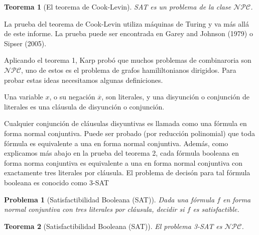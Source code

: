 \documentclass{article}
\newtheorem{theorem}{Teorema}
\newtheorem{problem}{Problema}
\begin{document}
\begin{theorem}[El teorema de Cook-Levin]
SAT es un problema de la clase $\mathcal{NPC}$.
\end{theorem}
La prueba del teorema de Cook-Levin utiliza máquinas de Turing
y va más allá de este informe. La prueba puede ser encontrada
en Garey and Johnson (1979) o Sipser (2005).

Aplicando el teorema 1, Karp probó que muchos problemas de
combinaroria son $\mathcal{NPC}$, uno de estos es el problema
de grafos hamililtonianos dirigidos. Para probar estas ideas
necesitamos algunas definiciones.

Una variable $x$, o su negación $\overline{x}$, son literales,
y una disyunción o conjunción de literales es una cláusula
de disyunción o conjunción.

Cualquier conjunción de cláusulas disyuntivas es llamada como
una fórmula en forma normal conjuntiva. Puede ser probado 
(por reducción polinomial) que toda fórmula es equivalente
a una en forma normal conjuntiva. Además, como explicamos más
abajo en la prueba del teorema 2, cada fórmula booleana en 
forma norma conjuntiva es equivalente a una en forma normal
conjuntiva con exactamente tres literales por cláusula. El
problema de decisón para tal fórmula booleana es conocido como
3-SAT

\begin{problem}[Satisfactibilidad Booleana (SAT)]
Dada una fórmula $f$ en forma normal conjuntiva con tres
literales por cláusula, decidir si $f$ es satisfactible.
\end{problem}

\begin{theorem}[Satisfactibilidad Booleana (SAT)]
El problema 3-SAT es $\mathcal{NPC}$.
\end{theorem}
\end{document}
